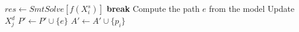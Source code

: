 	\STATE $res \gets SmtSolve\left[
	 f(X_i^s) 
	\right]$
		\STATE \textbf{break}
	\ENDIF
	\STATE Compute the path $e$ from the model
	\STATE Update $X^d_j$
	\STATE $P' \gets P' \cup \{e\}$
	\STATE $A' \gets A' \cup \{p_i\}$
\ENDWHILE
